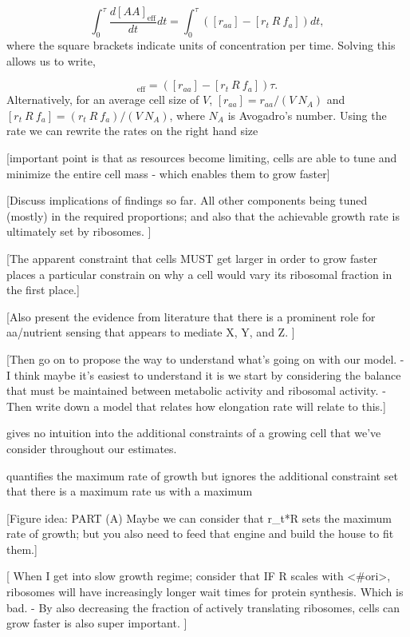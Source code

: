 \begin{equation}
\int_{0}^{\tau} \frac{d[AA]_{\text{eff}}}{dt} dt =  \int_{0}^{\tau} ([r_{aa}] - [r_t \ R \ f_a]) dt,
\end{equation}
where the square brackets indicate units of concentration per time. Solving this allows us to write,

\begin{equation}
[AA]_{\text{eff}} =  ([r_{aa}] - [r_t \ R \ f_a]) \tau.
\end{equation}
Alternatively, for an average cell size of $V$,  $[r_{aa}] = r_{aa}/(V \ N_A)$ and $[r_t \ R \ f_a] = (r_t \ R \ f_a)/(V \ N_A)$, where $N_A$ is Avogadro's number. Using the rate  we can rewrite the rates on the right hand size 


[important point is that as resources become limiting, cells are able to tune and minimize
the entire cell mass - which enables them to grow faster]

[Discuss implications of findings so far. All other components being tuned (mostly) in the required proportions; and also that the achievable growth rate is ultimately set by ribosomes. ]

[The apparent constraint that cells MUST get larger in order to grow faster places a particular constrain on why a cell would vary its ribosomal fraction in the first place.]

[Also present the evidence from literature that there is a prominent role for aa/nutrient sensing that appears to mediate X, Y, and Z. ]

[Then go on to propose the way to understand what’s going on with our model.
    - I think maybe it’s easiest to understand it is we start by considering the balance that must be maintained between metabolic activity and ribosomal activity.
    - Then write down a model that relates how elongation rate will relate to this.]



gives no intuition into the additional constraints of a growing
cell that we've consider throughout our estimates.



quantifies the maximum rate of growth but ignores the additional constraint set  that there is a maximum rate us with a maximum

[Figure idea: PART (A) Maybe we can consider that r_t*R sets the maximum rate of growth; but you also need to feed that engine and build the house to fit them.]

[ When I get into slow growth regime; consider that IF R scales with <#ori>, ribosomes will have increasingly longer wait times for protein synthesis. Which is bad.
    - By also decreasing the fraction of actively translating ribosomes, cells can grow faster is also super important. ]




